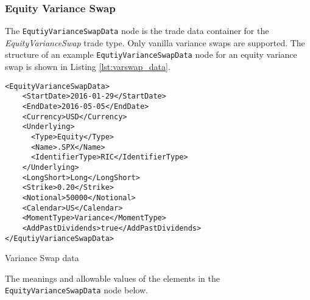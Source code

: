 \subsubsection{Equity Variance Swap}
\label{SubSectionEqVarianceSwap}

The \lstinline!EqutiyVarianceSwapData! node is the trade data container for the \emph{EquityVarianceSwap}  trade type. Only vanilla variance swaps are supported. The structure of an example \lstinline!EqutiyVarianceSwapData! node for an equity variance swap is shown in Listing \ref{lst:varswap_data}.

\begin{listing}[H]
	\begin{verbatim}
<EquityVarianceSwapData>
    <StartDate>2016-01-29</StartDate>
    <EndDate>2016-05-05</EndDate>
    <Currency>USD</Currency>
    <Underlying>
      <Type>Equity</Type>
      <Name>.SPX</Name>
      <IdentifierType>RIC</IdentifierType>
    </Underlying>
    <LongShort>Long</LongShort>
    <Strike>0.20</Strike>
    <Notional>50000</Notional>
    <Calendar>US</Calendar>
    <MomentType>Variance</MomentType>
    <AddPastDividends>true</AddPastDividends>
</EqutiyVarianceSwapData>
    \end{verbatim}
    \caption{Variance Swap data}
	\label{lst:varswap_data}
\end{listing}

The meanings and allowable values of the elements in the \lstinline!EquityVarianceSwapData! node below.

